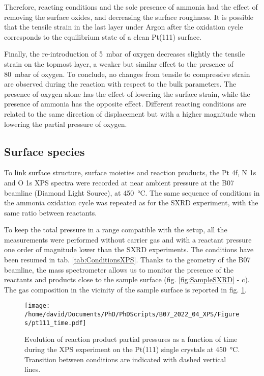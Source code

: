 Therefore, reacting conditions and the sole presence of ammonia had the effect of removing the surface oxides, and decreasing the surface roughness.
It is possible that the tensile strain in the last layer under Argon after the oxidation cycle corresponds to the equilibrium state of a clean Pt(111) surface.

Finally, the re-introduction of \qty{5}{\milli\bar} of oxygen decreases slightly the tensile strain on the topmost layer, a weaker but similar effect to the presence of \qty{80}{\milli\bar} of oxygen.
To conclude, no changes from tensile to compressive strain are observed during the reaction with respect to the bulk parameters.
The presence of oxygen alone has the effect of lowering the surface strain, while the presence of ammonia has the opposite effect.
Different reacting conditions are related to the same direction of displacement but with a higher magnitude when lowering the partial pressure of oxygen.

\subsection{Surface species}

To link surface structure, surface moieties and reaction products, the Pt 4f, N 1s and O 1s XPS spectra were recorded at near ambient pressure at the B07 beamline (Diamond Light Source), at \qty{450}{\degreeCelsius}.
The same sequence of conditions in the ammonia oxidation cycle was repeated as for the SXRD experiment, with the same ratio between reactants.

To keep the total pressure in a range compatible with the setup, all the measurements were performed without carrier gas and with a reactant pressure one order of magnitude lower than the SXRD experiments.
The conditions have been resumed in tab. \ref{tab:ConditionsXPS}.
Thanks to the geometry of the B07 beamline, the mass spectrometer allows us to monitor the presence of the reactants and products close to the sample surface (fig. \ref{fig:SampleSXRD} - c).
The gas composition in the vicinity of the sample surface is reported in fig. \ref{fig:XPS111RGA}.

\begin{figure}[!htb]
    \centering
    \texttt{[image: /home/david/Documents/PhD/PhDScripts/B07\_2022\_04\_XPS/Figures/pt111\_time.pdf]}
    \caption{
        Evolution of reaction product partial pressures as a function of time during the XPS experiment on the Pt(111) single crystals at \qty{450}{\degreeCelsius}.
        Transition between conditions are indicated with dashed vertical lines.
    }
    \label{fig:XPS111RGA}
\end{figure}

